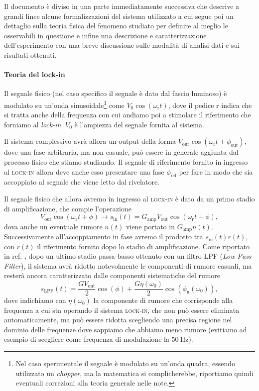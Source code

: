\documentclass[
    prb,altaffilletter,citeautoscript,
    amsmath,amssymb,
    showpacs,showkeys,floatfix,
    reprint
]{revtex4-1}
\begin{document}
Il documento è diviso in una parte immediatamente successiva che descrive a grandi linee alcune formalizzazioni del sistema utilizzato a cui segue poi un dettaglio sulla teoria fisica del fenomeno studiato per definire al meglio le osservabili in questione e infine una descrizione e caratterizzazione dell'esperimento con una breve discussione sulle modalità di analisi dati e sui risultati ottenuti. 

\paragraph*{Teoria del lock-in} 
Il segnale fisico (nel caso specifico il segnale è dato dal fascio luminoso) è modulato su un'onda sinusoidale\footnote{Nel caso sperimentale il segnale è modulato su un'onda quadra, essendo utilizzato un \emph{chopper}, ma la matematica si complicherebbe, riportiamo quindi eventuali correzioni alla teoria generale nelle note.} come $V_0 \cos(\omega_\mathrm{r} t)$, dove il pedice r indica che si tratta anche della frequenza con cui andiamo poi a stimolare il riferimento che forniamo al \emph{lock-in}. $V_0$ è l'ampiezza del segnale fornita al sistema. 

Il sistema complessivo avrà allora un output della forma $V_\mathrm{out} \cos(\omega_\mathrm{r} t + \phi_\mathrm{out}),$ dove una fase arbitraria, ma non casuale, può essere in generale aggiunta dal processo fisico che stiamo studiando. Il segnale di riferimento fornito in ingresso al \textsc{lock-in} allora deve anche esso presentare una fase $\phi_\mathrm{ref}$ per fare in modo che sia accoppiato al segnale che viene letto dal rivelatore. 

Il segnale fisico che allora avremo in ingresso al \textsc{lock-in} è dato da un primo stadio di amplificazione, che compie l'operazione \begin{equation}
    V_\mathrm{out} \cos(\omega_\mathrm{r} t + \phi) \to s_\mathrm{in}(t) = G_\mathrm{amp}V_\mathrm{out} \cos(\omega_\mathrm{r} t + \phi),
\end{equation} dova anche un eventuale rumore $n(t)$ viene portato in $G_\mathrm{amp}n(t)$. Successivamente all'accoppiamento in fase avremo il prodotto tra $s_\mathrm{in}(t)r(t)$, con $r(t)$ il riferimento fornito dopo lo stadio di amplificazione. Come riportato in ref. , dopo un ultimo stadio passa-basso ottenuto con un filtro LPF (\emph{Low Pass Filter}), il sistema avrà ridotto notevolmente le componenti di rumore casuali, ma resterà ancora caratterizzato dalle componenti sistematiche del rumore \begin{equation}
    s_\mathrm{LPF}(t) = \frac{G V_\mathrm{out}}{2} \cos(\phi) + \frac{G \eta(\omega_0)}{2}\cos(\phi_\mathrm{n}(\omega_0)), \label{eq:s_LPF}
\end{equation} dove indichiamo con $\eta(\omega_0)$ la componente di rumore che corrisponde alla frequenza a cui sta operando il sistema \textsc{lock-in}, che non può essere eliminata automaticamente, ma può essere ridotta scegliendo una precisa regione nel dominio delle frequenze dove sappiamo che abbiamo meno rumore (evitiamo ad esempio di scegliere come frequenza di modulazione la $\SI{50}{\Hz}$).
\end{document}
